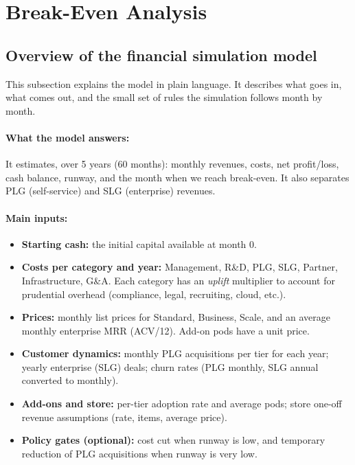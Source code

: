 \documentclass[11pt, a4paper, oneside]{article}
\begin{document}
\section{Break-Even Analysis}
\subsection{Overview of the financial simulation model}
\label{subsec:simple-model}

This subsection explains the model in plain language. It describes what goes in, what comes out, and the small set of rules the simulation follows month by month.

\paragraph{What the model answers:}
It estimates, over 5 years (60 months): monthly revenues, costs, net profit/loss, cash balance, runway, and the month when we reach break-even. It also separates PLG (self-service) and SLG (enterprise) revenues.

\paragraph{Main inputs:}
\begin{itemize}
\item \textbf{Starting cash:} the initial capital available at month 0.
\item \textbf{Costs per category and year:} Management, R\&D, PLG, SLG, Partner, Infrastructure, G\&A. Each category has an \emph{uplift} multiplier to account for prudential overhead (compliance, legal, recruiting, cloud, etc.).
\item \textbf{Prices:} monthly list prices for Standard, Business, Scale, and an average monthly enterprise MRR (ACV/12). Add-on pods have a unit price.
\item \textbf{Customer dynamics:} monthly PLG acquisitions per tier for each year; yearly enterprise (SLG) deals; churn rates (PLG monthly, SLG annual converted to monthly).
\item \textbf{Add-ons and store:} per-tier adoption rate and average pods; store one-off revenue assumptions (rate, items, average price).
\item \textbf{Policy gates (optional):} cost cut when runway is low, and temporary reduction of PLG acquisitions when runway is very low.
\end{itemize}
\end{document}
